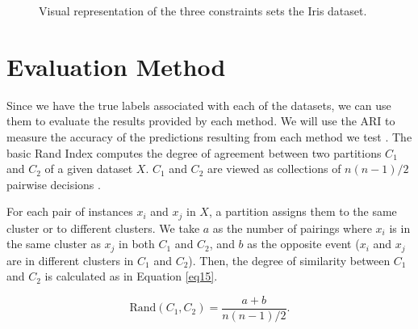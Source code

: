 \begin{figure}[bth]
	\caption{Visual representation of the three constraints sets the Iris dataset.}
	\label{fig:IrisConst}
\end{figure}

\section{Evaluation Method} \label{sec:EvalMet}

Since we have the true labels associated with each of the datasets, we can use them to evaluate the results provided by each method. We will use the \acf{ARI} to measure the accuracy of the predictions resulting from each method we test \cite{hubert1985comparing}. The basic Rand Index computes the degree of agreement between two partitions $C_1$ and $C_2$ of a given dataset $X$. $C_1$ and $C_2$ are viewed as collections of $n(n - 1)/2$ pairwise decisions \cite{rand1971objective}.

For each pair of instances $x_i$ and $x_j$ in $X$, a partition assigns them to the same cluster or to different clusters. We take $a$ as the number of pairings where $x_i$ is in the same cluster as $x_j$ in both $C_1$ and $C_2$, and $b$ as the opposite event ($x_i$ and $x_j$ are in different clusters in $C_1$ and $C_2$). Then, the degree of similarity between $C_1$ and $C_2$ is calculated as in Equation \eqref{eq15}.

\begin{equation}
\text{Rand}(C_1, C_2) = \frac{a + b}{n(n - 1)/2}.
\label{eq15}
\end{equation}


